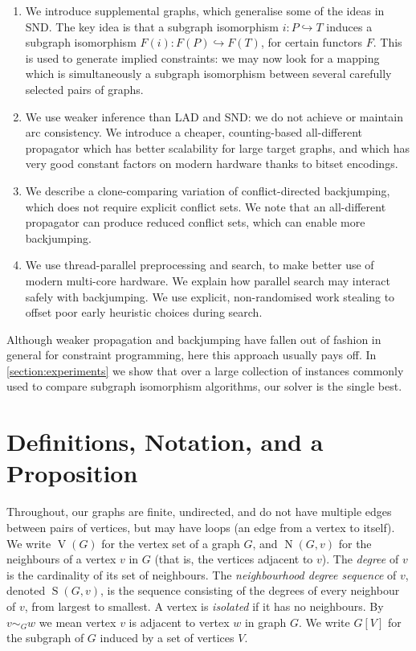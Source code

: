 \documentclass{llncs}
\begin{document}
\begin{enumerate}
    \item We introduce supplemental graphs, which generalise some of the ideas in SND. The key idea
        is that a subgraph isomorphism $i : P \hookrightarrow T$ induces a subgraph isomorphism
        $F(i) : F(P) \hookrightarrow F(T)$, for certain functors $F$.  This is used to generate
        implied constraints: we may now look for a mapping which is simultaneously a subgraph
        isomorphism between several carefully selected pairs of graphs.

    \item We use weaker inference than LAD and SND: we do not achieve or maintain arc consistency.
        We introduce a cheaper, counting-based all-different propagator which has better scalability
        for large target graphs, and which has very good constant factors on modern hardware thanks
        to bitset encodings.

    \item We describe a clone-comparing variation of conflict-directed backjumping, which does not
        require explicit conflict sets. We note that an all-different propagator can produce reduced
        conflict sets, which can enable more backjumping.

    \item We use thread-parallel preprocessing and search, to make better use of modern multi-core
        hardware. We explain how parallel search may interact safely with backjumping. We use
        explicit, non-randomised work stealing to offset poor early heuristic choices during search.
\end{enumerate}

\noindent Although weaker propagation and backjumping have fallen out of fashion in general for
constraint programming, here this approach usually pays off. In \cref{section:experiments} we show
that over a large collection of instances commonly used to compare subgraph isomorphism algorithms,
our solver is the single best.

\section{Definitions, Notation, and a Proposition}

Throughout, our graphs are finite, undirected, and do not have multiple edges between pairs of
vertices, but may have loops (an edge from a vertex to itself). We write $\operatorname{V}(G)$ for
the vertex set of a graph $G$, and $\operatorname{N}(G, v)$ for the neighbours of a vertex $v$ in
$G$ (that is, the vertices adjacent to $v$).  The \emph{degree} of $v$ is the cardinality of its set
of neighbours. The \emph{neighbourhood degree sequence} of $v$, denoted $\operatorname{S}(G, v)$, is
the sequence consisting of the degrees of every neighbour of $v$, from largest to smallest.  A
vertex is \emph{isolated} if it has no neighbours. By $v \sim_G w$ we mean vertex $v$ is adjacent to
vertex $w$ in graph $G$. We write $G[V]$ for the subgraph of $G$ induced by a set of vertices $V$.
\end{document}
